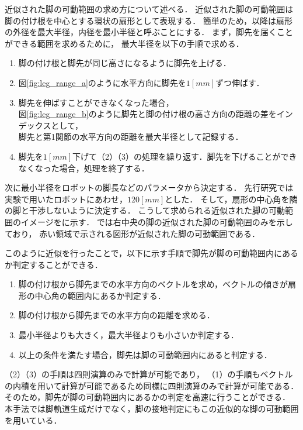 近似された脚の可動範囲の求め方について述べる．
近似された脚の可動範囲は脚の付け根を中心とする環状の扇形として表現する．
簡単のため，以降は扇形の外径を最大半径，内径を最小半径と呼ぶことにする．
まず，脚先を届くことができる範囲を求めるために，
最大半径を以下の手順で求める．
\begin{enumerate}
  \item 脚の付け根と脚先が同じ高さになるように脚先を上げる．
  \item 図\ref{fig:leg_range_a}のように水平方向に脚先を$1 [mm]$ずつ伸ばす．
  \item 脚先を伸ばすことができなくなった場合，\\
        図\ref{fig:leg_range_b}のように脚先と脚の付け根の高さ方向の距離の差をインデックスとして，\\
        脚先と第1関節の水平方向の距離を最大半径として記録する．
  \item 脚先を$1 [mm]$下げて（2）（3）の処理を繰り返す．脚先を下げることができなくなった場合，処理を終了する．
\end{enumerate}
次に最小半径をロボットの脚長などのパラメータから決定する．
先行研究では実験で用いたロボットにあわせ，$120 [mm]$とした．
そして，扇形の中心角を隣の脚と干渉しないように決定する．
こうして求められる近似された脚の可動範囲のイメージをに示す．
では右中央の脚の近似された脚の可動範囲のみを示しており，
赤い領域で示される図形が近似された脚の可動範囲である．

このように近似を行ったことで，以下に示す手順で脚先が脚の可動範囲内にあるか判定することができる．
\begin{enumerate}
  \item 脚の付け根から脚先までの水平方向のベクトルを求め，ベクトルの傾きが扇形の中心角の範囲内にあるか判定する．
  \item 脚の付け根から脚先までの水平方向の距離を求める．
  \item 最小半径よりも大きく，最大半径よりも小さいか判定する．
  \item 以上の条件を満たす場合，脚先は脚の可動範囲内にあると判定する．
\end{enumerate}
（2）（3）の手順は四則演算のみで計算が可能であり，
（1）の手順もベクトルの内積を用いて計算が可能であるため同様に四則演算のみで計算が可能である．
そのため，脚先が脚の可動範囲内にあるかの判定を高速に行うことができる．
本手法では脚軌道生成だけでなく，脚の接地判定にもこの近似的な脚の可動範囲を用いている．


